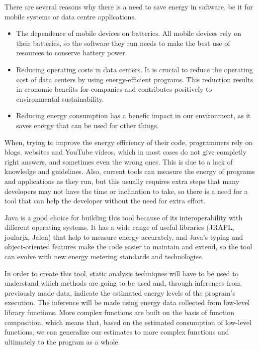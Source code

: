 \documentclass[sigplan]{acmart}
\begin{document}
There are several reasons why there is a need to save energy in software, be it for mobile systems or data centre applications. \\

\begin{itemize}
  \item The dependence of mobile devices on batteries. All mobile devices rely on their batteries, so the software they run needs to make the best use of resources to conserve battery power.
  \item Reducing operating costs in data centers. It is crucial to reduce the operating cost of data centers by using energy-efficient programs. This reduction results in economic benefits for companies and contributes positively to environmental sustainability. 
  \item Reducing energy consumption has a benefic impact in our environment, as it saves energy that can be used for other things. \\
\end{itemize}

When, trying to improve the energy efficiency of their code, programmers rely on blogs, websites and YouTube videos, which in most cases do not give completly right answers, and sometimes even the wrong ones. This is due to a lack of knowledge and guidelines.
Also, current tools can measure the energy of programs and applications as they run, but this usually requires extra steps that many developers may not have the time or inclination to take, so there is a need for a tool that can help the developer without the need for extra effort\cite{10.1145/3154384}. 

Java is a good choice for building this tool because of its interoperability with different operating systems. It has a wide range of useful libraries (JRAPL, joularjx, Jalen) that help to measure energy accurately, and Java's typing and object-oriented features make the code easier to maintain and extend, so the tool can evolve with new energy metering standards and technologies. 

In order to create this tool, static analysis techniques will have to be used to understand which methods are going to be used and, through inferences from previously made data, indicate the estimated energy levels of the program's execution. The inference will be made using energy data collected from low-level library functions. More complex functions are built on the basis of function composition, which means that, based on the estimated consumption of low-level functions, we can generalize our estimates to more complex functions and ultimately to the program as a whole. 
\end{document}
